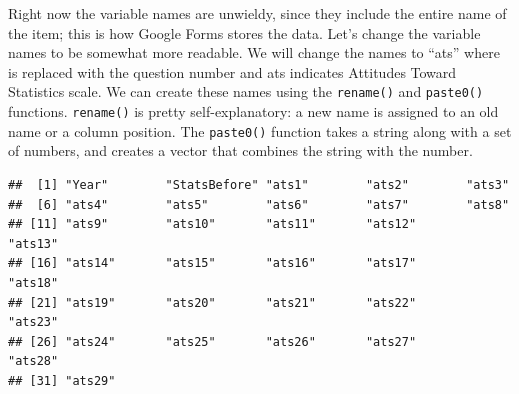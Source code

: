 \documentclass[12pt,]{book}
\newenvironment{Shaded}{\begin{snugshade}}{\end{snugshade}}
\newcommand{\CommentTok}[1]{\textcolor[rgb]{0.56,0.35,0.01}{\textit{#1}}}
\newcommand{\DataTypeTok}[1]{\textcolor[rgb]{0.13,0.29,0.53}{#1}}
\newcommand{\DecValTok}[1]{\textcolor[rgb]{0.00,0.00,0.81}{#1}}
\newcommand{\KeywordTok}[1]{\textcolor[rgb]{0.13,0.29,0.53}{\textbf{#1}}}
\newcommand{\NormalTok}[1]{#1}
\newcommand{\OperatorTok}[1]{\textcolor[rgb]{0.81,0.36,0.00}{\textbf{#1}}}
\newcommand{\StringTok}[1]{\textcolor[rgb]{0.31,0.60,0.02}{#1}}
\begin{document}
Right now the variable names are unwieldy, since they include the entire name of the item; this is how Google Forms stores the data. Let's change the variable names to be somewhat more readable. We will change the names to ``ats'' where is replaced with the question number and ats indicates Attitudes Toward Statistics scale. We can create these names using the \texttt{rename()} and \texttt{paste0()} functions. \texttt{rename()} is pretty self-explanatory: a new name is assigned to an old name or a column position. The \texttt{paste0()} function takes a string along with a set of numbers, and creates a vector that combines the string with the number.

\begin{Shaded}
\end{Shaded}

\begin{verbatim}
##  [1] "Year"        "StatsBefore" "ats1"        "ats2"        "ats3"       
##  [6] "ats4"        "ats5"        "ats6"        "ats7"        "ats8"       
## [11] "ats9"        "ats10"       "ats11"       "ats12"       "ats13"      
## [16] "ats14"       "ats15"       "ats16"       "ats17"       "ats18"      
## [21] "ats19"       "ats20"       "ats21"       "ats22"       "ats23"      
## [26] "ats24"       "ats25"       "ats26"       "ats27"       "ats28"      
## [31] "ats29"
\end{verbatim}
\end{document}
